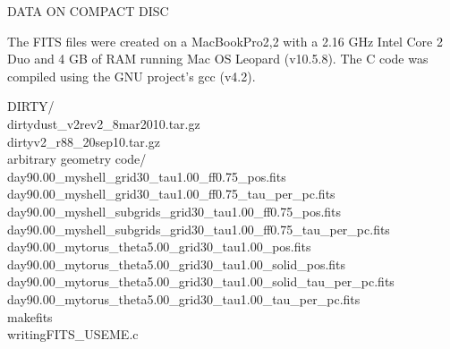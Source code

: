 
\begin{center}
DATA ON COMPACT DISC
\end{center}
The FITS files were created on a MacBookPro2,2 with a 2.16 GHz Intel Core 2 Duo and 4 GB of RAM running Mac OS Leopard (v10.5.8). The C code was compiled using the GNU project's gcc (v4.2).

\begin{tabbing}
DIRTY/\= \\
\>dirtydust\_v2rev2\_8mar2010.tar.gz\\
\>dirtyv2\_r88\_20sep10.tar.gz\\
arbitrary  geometry code/ \\
\>day90.00\_myshell\_grid30\_tau1.00\_ff0.75\_pos.fits \\
\>day90.00\_myshell\_grid30\_tau1.00\_ff0.75\_tau\_per\_pc.fits \\
\>day90.00\_myshell\_subgrids\_grid30\_tau1.00\_ff0.75\_pos.fits \\
\>day90.00\_myshell\_subgrids\_grid30\_tau1.00\_ff0.75\_tau\_per\_pc.fits \\
\>day90.00\_mytorus\_theta5.00\_grid30\_tau1.00\_pos.fits \\
\>day90.00\_mytorus\_theta5.00\_grid30\_tau1.00\_solid\_pos.fits \\
\>day90.00\_mytorus\_theta5.00\_grid30\_tau1.00\_solid\_tau\_per\_pc.fits \\
\>day90.00\_mytorus\_theta5.00\_grid30\_tau1.00\_tau\_per\_pc.fits \\
\>makefits \\
\>writingFITS\_USEME.c \\
\end{tabbing}
